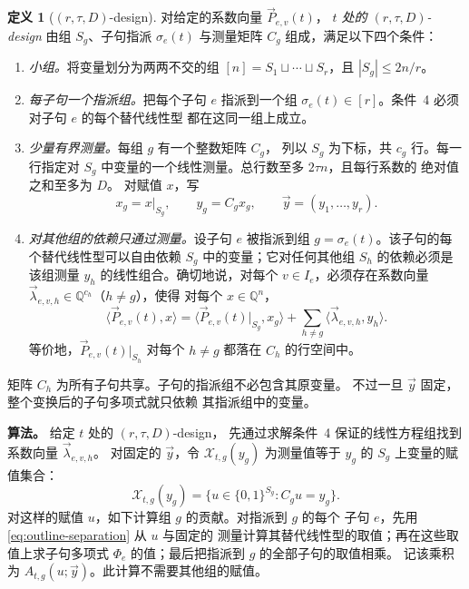 \documentclass[11pt,reqno]{amsart}
\numberwithin{equation}{section}
\theoremstyle{definition}\newtheorem{definition}[theorem]{定义}
\theoremstyle{remark}\newtheorem{remark}[theorem]{注}
\renewcommand{\le}{\leqslant}
\begin{document}
\begin{definition}[$(r,\tau,D)$-design]
\label{def:overview-measurement-structure}
对给定的系数向量 $\vec{P}_{e,v}(t)$，
\emph{$t$ 处的 $(r,\tau,D)$-design}
由组 $S_g$、子句指派 $\sigma_e(t)$ 与测量矩阵 $C_g$
组成，满足以下四个条件：
\begin{enumerate}
\item \emph{小组。}将变量划分为两两不交的组
$[n]=S_1\sqcup\cdots\sqcup S_r$，且 $|S_g|\le2n/r$。
\item \emph{每子句一个指派组。}把每个子句 $e$ 指派到一个组
$\sigma_e(t)\in[r]$。条件~4 必须对子句 $e$ 的每个替代线性型
都在这同一组上成立。
\item \emph{少量有界测量。}每组 $g$ 有一个整数矩阵 $C_g$，
列以 $S_g$ 为下标，共 $c_g$ 行。每一行指定对 $S_g$
中变量的一个线性测量。总行数至多 $2\tau n$，且每行系数的
绝对值之和至多为 $D$。
对赋值 $x$，写
\[
 x_g=x|_{S_g},\qquad y_g=C_gx_g,\qquad
 \vec{y}=(y_1,\ldots,y_r).
\]
\item \emph{对其他组的依赖只通过测量。}设子句 $e$ 被指派到组
$g=\sigma_e(t)$。该子句的每个替代线性型可以自由依赖 $S_g$
中的变量；它对任何其他组 $S_h$ 的依赖必须是该组测量 $y_h$
的线性组合。确切地说，对每个 $v\in I_e$，必须存在系数向量
$\vec{\lambda}_{e,v,h}\in\mathbb Q^{c_h}$（$h\ne g$），使得
对每个 $x\in\mathbb Q^n$，
\begin{equation}\label{eq:outline-separation}
 \langle\vec{P}_{e,v}(t),x\rangle
 =\langle\vec{P}_{e,v}(t)|_{S_g},x_g\rangle
   +\sum_{h\ne g}\langle\vec{\lambda}_{e,v,h},y_h\rangle.
\end{equation}
等价地，$\vec{P}_{e,v}(t)|_{S_h}$ 对每个 $h\ne g$ 都落在 $C_h$
的行空间中。
\end{enumerate}
\end{definition}
矩阵 $C_h$ 为所有子句共享。子句的指派组不必包含其原变量。
不过一旦 $\vec{y}$ 固定，整个变换后的子句多项式就只依赖
其指派组中的变量。

\smallskip\noindent
\textbf{算法。}
给定 $t$ 处的 $(r,\tau,D)$-design，
先通过求解条件~4 保证的线性方程组找到系数向量
$\vec{\lambda}_{e,v,h}$。
对固定的 $\vec{y}$，令 $\mathcal X_{t,g}(y_g)$ 为测量值等于
$y_g$ 的 $S_g$ 上变量的赋值集合：
\[
 \mathcal X_{t,g}(y_g)
 =\{u\in\{0,1\}^{S_g}:C_gu=y_g\}.
\]
对这样的赋值 $u$，如下计算组 $g$ 的贡献。对指派到 $g$ 的每个
子句 $e$，先用 \eqref{eq:outline-separation} 从 $u$ 与固定的
测量计算其替代线性型的取值；再在这些取值上求子句多项式
$\Phi_e$ 的值；最后把指派到 $g$ 的全部子句的取值相乘。
记该乘积为 $A_{t,g}(u;\vec{y})$。此计算不需要其他组的赋值。
\end{document}
